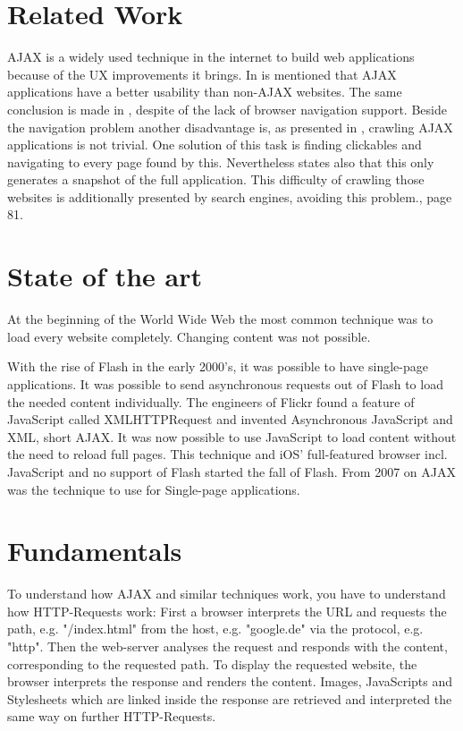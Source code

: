 \documentclass[f,bachelor,binding,twoside,palatino]{WeSTthesis}
\def \ajax {AJAX}
\def \singlePageApplication {single-page application}
\begin{document}
\section{Related Work}
  \ajax{} is a widely used technique in the internet to build web applications because of the UX improvements it brings.
  In \cite{roodt06} is mentioned that \ajax{} applications have a better usability than non-\ajax{} websites.
  The same conclusion is made in \cite{klugeKarglWeber07}, despite of the lack of browser navigation support.
  Beside the navigation problem another disadvantage is, as presented in \cite{mesbah09}, crawling \ajax{} applications is not trivial.
  One solution of this task is finding clickables and navigating to every page found by this.
  Nevertheless \cite{mesbah09} states also that this only generates a snapshot of the full application.
  This difficulty of crawling those websites is additionally presented by search engines, avoiding this problem.\cite{matter08}, page 81.


\section{State of the art}
  At the beginning of the World Wide Web the most common technique was to load every website completely. Changing content was not possible.
    
  With the rise of Flash in the early 2000's, it was possible to have \singlePageApplication{}s. It was possible to send asynchronous requests out of Flash to load the needed content individually.
  The engineers of Flickr found a feature of JavaScript called XMLHTTPRequest and invented Asynchronous JavaScript and XML, short \ajax{}. It was now possible to use JavaScript to load content without the need to reload full pages.
  This technique and iOS' full-featured browser incl. JavaScript and no support of Flash started the fall of Flash. From 2007 on \ajax{} was the technique to use for Single-page applications.
  
\section{Fundamentals}
  To understand how \ajax{} and similar techniques work, you have to understand how HTTP-Requests work:
  First a browser interprets the URL and requests the path, e.g. "/index.html" from the host, e.g. "google.de" via the protocol, e.g. "http".
  Then the web-server analyses the request and responds with the content, corresponding to the requested path.
  To display the requested website, the browser interprets the response and renders the content. 
  Images, JavaScripts and Stylesheets which are linked inside the response are retrieved and interpreted the same way on further HTTP-Requests.
\end{document}
